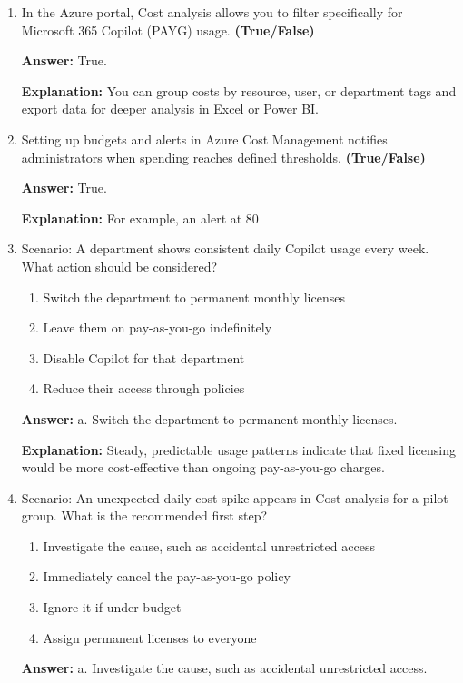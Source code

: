\documentclass[10pt]{article}
\begin{document}
\begin{enumerate}[leftmargin=*]
\textbf{Answer:} True.

\textbf{Explanation:} These dashboards help confirm license allocation and review month-over-month trends.

\item In the Azure portal, Cost analysis allows you to filter specifically for Microsoft 365 Copilot (PAYG) usage. \textbf{(True/False)}

\textbf{Answer:} True.

\textbf{Explanation:} You can group costs by resource, user, or department tags and export data for deeper analysis in Excel or Power BI.

\item Setting up budgets and alerts in Azure Cost Management notifies administrators when spending reaches defined thresholds. \textbf{(True/False)}

\textbf{Answer:} True.

\textbf{Explanation:} For example, an alert at 80%

\item Scenario: A department shows consistent daily Copilot usage every week. What action should be considered?
\begin{enumerate}[label=\alph*., leftmargin=1.5em]
\item Switch the department to permanent monthly licenses
\item Leave them on pay-as-you-go indefinitely
\item Disable Copilot for that department
\item Reduce their access through policies
\end{enumerate}
\textbf{Answer:} a. Switch the department to permanent monthly licenses.

\textbf{Explanation:} Steady, predictable usage patterns indicate that fixed licensing would be more cost-effective than ongoing pay-as-you-go charges.

\item Scenario: An unexpected daily cost spike appears in Cost analysis for a pilot group. What is the recommended first step?
\begin{enumerate}[label=\alph*., leftmargin=1.5em]
\item Investigate the cause, such as accidental unrestricted access
\item Immediately cancel the pay-as-you-go policy
\item Ignore it if under budget
\item Assign permanent licenses to everyone
\end{enumerate}
\textbf{Answer:} a. Investigate the cause, such as accidental unrestricted access.


\end{enumerate}
\end{document}
